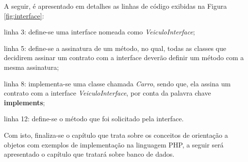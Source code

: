 A seguir, é apresentado em detalhes as linhas de código exibidas na Figura
\ref{fig:interface}:

\begin{alineas}
    \item linha 3: define-se uma interface nomeada como
    \textit{VeiculoInterface};
    \item linha 5: define-se a assinatura de um método, no qual, todas as
    classes que decidirem assinar um contrato com a interface deverão definir um
    método com a mesma assinatura;
    \item linha 8: implementa-se uma classe chamada \textit{Carro}, sendo que,
    ela assina um contrato com a interface \textit{VeiculoInterface}, por conta
    da palavra chave \textbf{implements};
    \item linha 12: define-se o método que foi solicitado pela interface.
\end{alineas}

Com isto, finaliza-se o capítulo que trata sobre os conceitos de orientação a
objetos com exemplos de implementação na linguagem \acs{PHP}, a seguir será
apresentado o capítulo que tratará sobre banco de dados.
